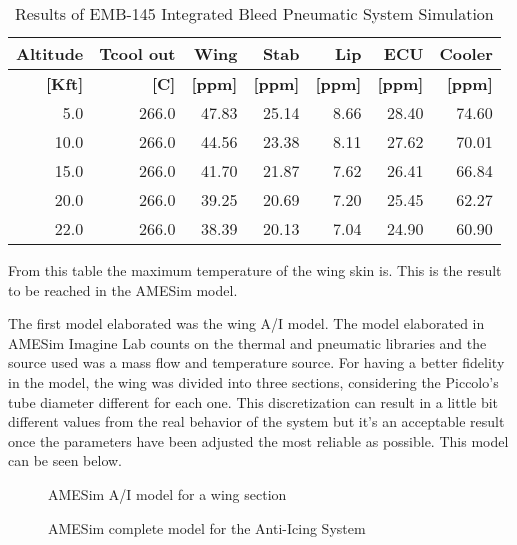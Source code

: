 \begin{table}[htbp]
  \centering
  \caption{Results of EMB-145 Integrated Bleed Pneumatic System Simulation}
    \begin{tabular}{rrrrrrr}
    \toprule
    \textbf{Altitude} & \textbf{Tcool out} & \textbf{Wing} & \textbf{Stab} & \textbf{Lip} & \textbf{ECU} & \textbf{Cooler} \\
    \midrule
    \textbf{[Kft]} & \textbf{[C]} & \textbf{[ppm]} & \textbf{[ppm]} & \textbf{[ppm]} & \textbf{[ppm]} & \textbf{[ppm]} \\
    5.0   & 266.0 & 47.83 & 25.14 & 8.66  & 28.40 & 74.60 \\
    10.0  & 266.0 & 44.56 & 23.38 & 8.11  & 27.62 & 70.01 \\
    15.0  & 266.0 & 41.70 & 21.87 & 7.62  & 26.41 & 66.84 \\
    20.0  & 266.0 & 39.25 & 20.69 & 7.20  & 25.45 & 62.27 \\
    22.0  & 266.0 & 38.39 & 20.13 & 7.04  & 24.90 & 60.90 \\
    \bottomrule
    \end{tabular}%
  \label{tab:ResultsIBPS2}%
\end{table}%

From this table the maximum temperature of the wing skin is. This is the result to be reached in the AMESim model.

The first model elaborated was the wing A/I model. The model elaborated in AMESim Imagine Lab counts on the thermal and pneumatic libraries and the source used was a mass flow and temperature source. For having a better fidelity in the model, the wing was divided into three sections, considering the Piccolo's tube diameter different for each one. This discretization can result in a little bit different values from the real behavior of the system but it's an acceptable result once the parameters have been adjusted the most reliable as possible. This model can be seen below.

\begin{figure}[H] %
    \caption{AMESim A/I model for a wing section}
    \label{fig:AMESimAImodel}
\end{figure}

\begin{figure}[H] %
    \caption{AMESim complete model for the Anti-Icing System}
    \label{fig:AMESimCompleteModel}
\end{figure}

